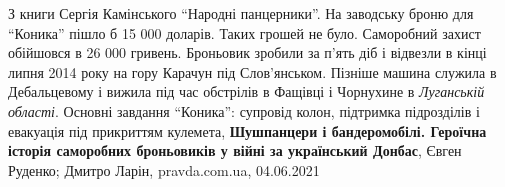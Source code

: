 З книги Сергія Камінського \enquote{Народні панцерники}.  На заводську броню
для \enquote{Коника} пішло б 15 000 доларів. Таких грошей не було. Саморобний
захист обійшовся в 26 000 гривень. Броньовик зробили за п'ять діб і відвезли в
кінці липня 2014 року на гору Карачун під Слов'янськом.  Пізніше машина служила
в Дебальцевому і вижила під час обстрілів в Фащівці і Чорнухине в \emph{Луганській
області}. Основні завдання \enquote{Коника}: супровід колон, підтримка
підрозділів і евакуація під прикриттям кулемета,
\textbf{Шушпанцери і бандеромобілі. Героїчна історія саморобних броньовиків у війні за український Донбас},
Євген Руденко; Дмитро Ларін, pravda.com.ua, 04.06.2021


